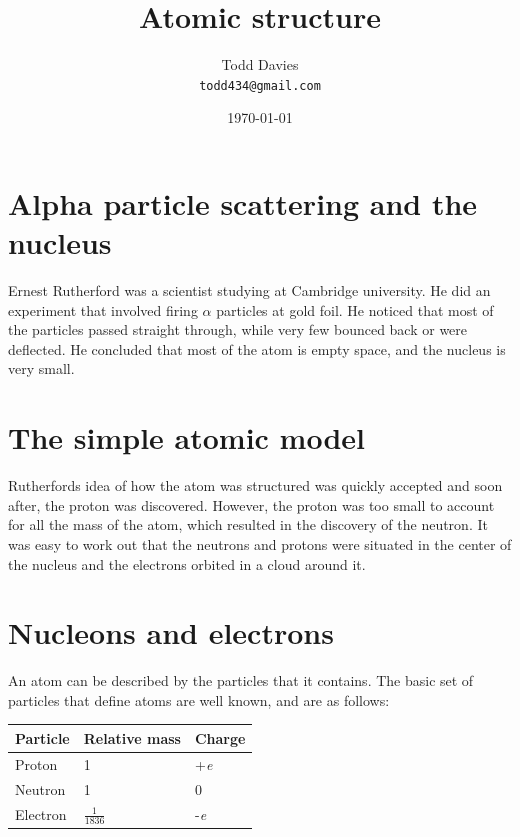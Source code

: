 \documentclass{article}
\title{Atomic structure}
\author{Todd Davies\\
	\texttt{\small todd434@gmail.com}}
\date{\today}
\begin{document}
\lhead{\today}

\maketitle

\section*{Alpha particle scattering and the nucleus}
\thispagestyle{empty}

Ernest Rutherford was a scientist studying at Cambridge university. He did an
experiment that involved firing $\alpha$ particles at gold foil. He noticed that
most of the particles passed straight through, while very few bounced back or
were deflected. He concluded that most of the atom is empty space, and the
nucleus is very small.

\section*{The simple atomic model}

Rutherfords idea of how the atom was structured was quickly accepted and soon
after, the proton was discovered. However, the proton was too small to account
for all the mass of the atom, which resulted in the discovery of the neutron. It
was easy to work out that the neutrons and protons were situated in the center
of the nucleus and the electrons orbited in a cloud around it.

\section*{Nucleons and electrons}

An atom can be described by the particles that it contains. The basic set of
particles that define atoms are well known, and are as follows:

\begin{center}
 	\renewcommand{\arraystretch}{1.2}
	\begin{tabular}{l|l|l}
		{\bf Particle} & {\bf Relative mass} & {\bf Charge} \\ \hline
		Proton & 1 & +{\it e}\\ \hline
		Neutron & 1 & 0\\ \hline
		Electron & $\frac{1}{1836}$ & -{\it e}
	\end{tabular}

\end{center}
\end{document}
